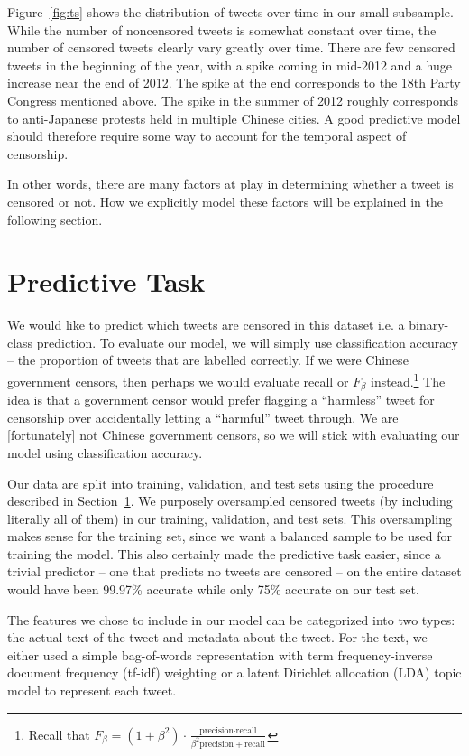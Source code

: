 \documentclass{sig-alternate-05-2015}
\begin{document}
Figure~\ref{fig:ts} shows the distribution of tweets over time in our small subsample. While the number of noncensored tweets is somewhat constant over time, the number of censored tweets clearly vary greatly over time. There are few censored tweets in the beginning of the year, with a spike coming in mid-2012 and a huge increase near the end of 2012. The spike at the end corresponds to the 18th Party Congress mentioned above. The spike in the summer of 2012 roughly corresponds to anti-Japanese protests held in multiple Chinese cities. A good predictive model should therefore require some way to account for the temporal aspect of censorship. 

In other words, there are many factors at play in determining whether a tweet is censored or not. How we explicitly model these factors will be explained in the following section.

\section{Predictive Task} \label{sec:pred}
We would like to predict which tweets are censored in this dataset i.e. a binary-class prediction. To evaluate our model, we will simply use classification accuracy -- the proportion of tweets that are labelled correctly. If we were Chinese government censors, then perhaps we would evaluate recall or $F_\beta$ instead.\footnote{Recall that $F_\beta = (1+\beta^2) \cdot \frac{\text{precision} \cdot \text{recall}}{\beta^2 \text{precision} + \text{recall}}$} The idea is that a government censor would prefer flagging a ``harmless'' tweet for censorship over accidentally letting a ``harmful'' tweet through. We are [fortunately] not Chinese government censors, so we will stick with evaluating our model using classification accuracy. 

Our data are split into training, validation, and test sets using the procedure described in Section~\ref{sec:pred}. We purposely oversampled censored tweets (by including literally all of them) in our training, validation, and test sets. This oversampling makes sense for the training set, since we want a balanced sample to be used for training the model. This also certainly made the predictive task easier, since a trivial predictor -- one that predicts no tweets are censored -- on the entire dataset would have been 99.97\% accurate while only 75\% accurate on our test set. 

The features we chose to include in our model can be categorized into two types: the actual text of the tweet and metadata about the tweet. For the text, we either used a simple bag-of-words representation with term frequency-inverse document frequency (tf-idf) weighting or a latent Dirichlet allocation (LDA) topic model to represent each tweet. 
\end{document}
